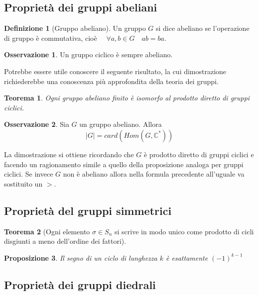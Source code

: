 \documentclass[11pt]{article}
\theoremstyle{plain}
\newtheorem{thm}{Teorema}[section]
\newtheorem{prop}[thm]{Proposizione}
\theoremstyle{definition}
\newtheorem{defn}{Definizione}[section]
\newtheorem*{rem}{Osservazione}
\theoremstyle{remark}
\newcommand{\C}{\mathbb{C}}
\begin{document}
\subsection{Proprietà dei gruppi abeliani}
\begin{defn}[Gruppo abeliano] Un gruppo $G$ si dice abeliano se l'operazione di gruppo è commutativa, cioè $\quad\forall a,b\in G\quad ab=ba$.
\end{defn}

\begin{rem} Un gruppo ciclico è sempre abeliano.
\end{rem}

Potrebbe essere utile conoscere il seguente risultato, la cui dimostrazione richiederebbe una conoscenza più approfondita della teoria dei gruppi.
\begin{thm}Ogni gruppo abeliano finito è isomorfo al prodotto diretto di gruppi ciclici.
\end{thm}

\begin{rem} Sia $G$ un gruppo abeliano. Allora 
\[ |G| = card(Hom(G,\C^*))\]

La dimostrazione si ottiene ricordando che $G$ è prodotto diretto di gruppi ciclici e facendo un ragionamento simile a quello
della proposizione analoga per gruppi ciclici.
Se invece $G$ non è abeliano allora nella formula precedente all'uguale va sostituito un $>$.
\end{rem}



\subsection{Proprietà del gruppi simmetrici}

\begin{thm}[Ogni elemento $\sigma \in S_n$ si scrive in modo unico come prodotto di cicli disgiunti a meno dell'ordine dei fattori]


\end{thm}

\begin{prop}Il segno di un ciclo di lunghezza $k$ è esattamente $(-1)^{k-1}$


\end{prop}



\subsection{Proprietà dei gruppi diedrali}
\end{document}

